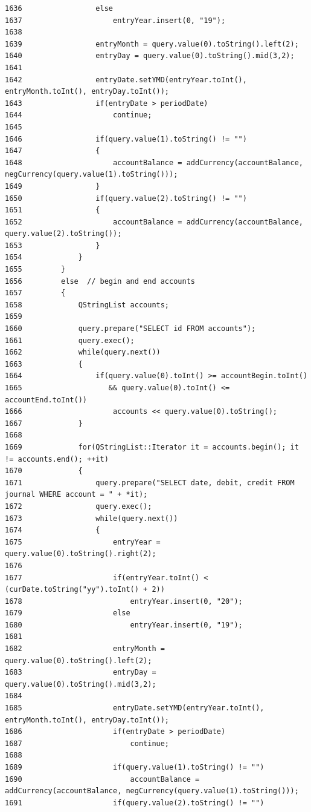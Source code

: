 \begin{verbatim}
1636                 else
1637                     entryYear.insert(0, "19");
1638                 
1639                 entryMonth = query.value(0).toString().left(2);
1640                 entryDay = query.value(0).toString().mid(3,2);
1641                 
1642                 entryDate.setYMD(entryYear.toInt(), entryMonth.toInt(), entryDay.toInt());
1643                 if(entryDate > periodDate)
1644                     continue;
1645 
1646                 if(query.value(1).toString() != "")
1647                 {
1648                     accountBalance = addCurrency(accountBalance, negCurrency(query.value(1).toString()));
1649                 }
1650                 if(query.value(2).toString() != "")
1651                 {
1652                     accountBalance = addCurrency(accountBalance, query.value(2).toString());
1653                 }
1654             }
1655         }
1656         else  // begin and end accounts
1657         {
1658             QStringList accounts;
1659 
1660             query.prepare("SELECT id FROM accounts");
1661             query.exec();
1662             while(query.next())
1663             {
1664                 if(query.value(0).toInt() >= accountBegin.toInt()
1665                    && query.value(0).toInt() <= accountEnd.toInt())
1666                     accounts << query.value(0).toString();
1667             }
1668 
1669             for(QStringList::Iterator it = accounts.begin(); it != accounts.end(); ++it)
1670             {
1671                 query.prepare("SELECT date, debit, credit FROM journal WHERE account = " + *it);
1672                 query.exec();
1673                 while(query.next())
1674                 {
1675                     entryYear = query.value(0).toString().right(2);
1676                 
1677                     if(entryYear.toInt() < (curDate.toString("yy").toInt() + 2))
1678                         entryYear.insert(0, "20");
1679                     else
1680                         entryYear.insert(0, "19");
1681                 
1682                     entryMonth = query.value(0).toString().left(2);
1683                     entryDay = query.value(0).toString().mid(3,2);
1684                 
1685                     entryDate.setYMD(entryYear.toInt(), entryMonth.toInt(), entryDay.toInt());
1686                     if(entryDate > periodDate)
1687                         continue;
1688 
1689                     if(query.value(1).toString() != "")
1690                         accountBalance = addCurrency(accountBalance, negCurrency(query.value(1).toString()));
1691                     if(query.value(2).toString() != "")

\end{verbatim}
